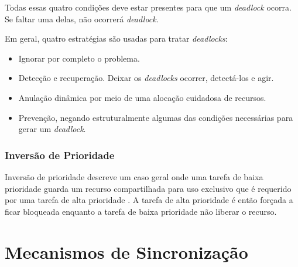 Todas essas quatro condições deve estar presentes para que um
\textit{deadlock} ocorra. Se faltar uma delas, não ocorrerá
\textit{deadlock}.

Em geral, quatro estratégias são usadas para tratar \textit{deadlocks}:

\begin{itemize}
\item Ignorar por completo o problema.
\item Detecção e recuperação. Deixar os \textit{deadlocks} ocorrer,
detectá-los e agir.
\item Anulação dinâmica por meio de uma alocação cuidadosa de recursos.
\item Prevenção, negando estruturalmente algumas das condições necessárias
para gerar um \textit{deadlock}.
\end{itemize}

\subsubsection{Inversão de Prioridade}

Inversão de prioridade descreve um caso geral onde uma tarefa de baixa
prioridade guarda um recurso compartilhada para uso exclusivo que é
requerido por uma tarefa de alta prioridade \cite{intel}. A tarefa de alta
prioridade é então forçada a ficar bloqueada enquanto a tarefa de baixa
prioridade não liberar o recurso.

%
%
%

\section{Mecanismos de Sincronização}
\label{sec:mecanismo}

